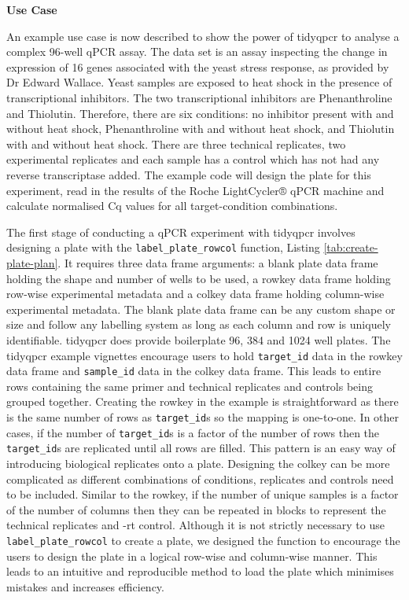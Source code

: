 \documentclass[../main.tex]{subfiles}
\begin{document}
\textbf{Use Case}

An example use case is now described to show the power of tidyqpcr to analyse a complex 96-well qPCR assay.
The data set is an assay inspecting the change in expression of 16 genes associated with the yeast stress response, as provided by Dr Edward Wallace.
Yeast samples are exposed to heat shock in the presence of transcriptional inhibitors.
The two transcriptional inhibitors are Phenanthroline and Thiolutin.
Therefore, there are six conditions: no inhibitor present with and without heat shock, Phenanthroline with and without heat shock, and Thiolutin with and without heat shock.
There are three technical replicates, two experimental replicates and each sample has a control which has not had any reverse transcriptase added.
The example code will design the plate for this experiment, read in the results of the Roche LightCycler® qPCR machine and calculate normalised Cq values for all target-condition combinations.

The first stage of conducting a qPCR experiment with tidyqpcr involves designing a plate with the \lstinline{label_plate_rowcol} function, Listing  \ref{tab:create-plate-plan}. 
It requires three data frame arguments: a blank plate data frame holding the shape and number of wells to be used, a rowkey data frame holding row-wise experimental metadata and a colkey data frame holding column-wise experimental metadata.
The blank plate data frame can be any custom shape or size and follow any labelling system as long as each column and row is uniquely identifiable. 
tidyqpcr does provide boilerplate 96, 384 and 1024 well plates.
The tidyqpcr example vignettes encourage users to hold \lstinline{target_id} data in the rowkey data frame and \lstinline{sample_id} data in the colkey data frame.
This leads to entire rows containing the same primer and technical replicates and controls being grouped together.
Creating the rowkey in the example is straightforward as there is the same number of rows as \lstinline{target_id}s so the mapping is one-to-one.
In other cases, if the number of \lstinline{target_id}s is a factor of the number of rows then the \lstinline{target_id}s are replicated until all rows are filled.
This pattern is an easy way of introducing biological replicates onto a plate. 
Designing the colkey can be more complicated as different combinations of conditions, replicates and controls need to be included.
Similar to the rowkey, if the number of unique samples is a factor of the number of columns then they can be repeated in blocks to represent the technical replicates and -rt control.
Although it is not strictly necessary to use \lstinline{label_plate_rowcol} to create a plate, we designed the function to encourage the users to design the plate in a logical row-wise and column-wise manner.
This leads to an intuitive and reproducible method to load the plate which minimises mistakes and increases efficiency. 
\end{document}
